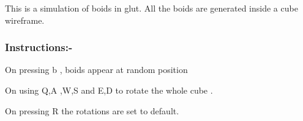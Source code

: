 This is a simulation of boids in glut. All the boids are generated inside a cube wireframe. \subsubsection*{Instructions\+:-\/}


\begin{DoxyEnumerate}
\item On pressing b , boids appear at random position
\item On using Q,A ,W,S and E,D to rotate the whole cube .
\item On pressing R the rotations are set to default. 
\end{DoxyEnumerate}